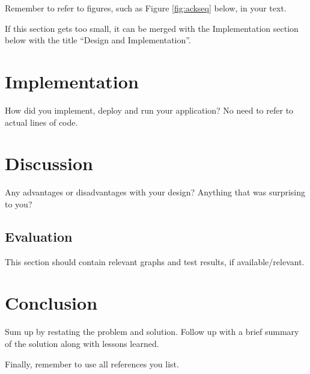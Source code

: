 \documentclass{article}
\begin{document}
Remember to refer to figures, such as Figure \ref{fig:ackseq} below, in your text.


If this section gets too small, it can be merged with the Implementation section below with the title ``Design and Implementation''.

\section{Implementation}

How did you implement, deploy and run your application? No need to refer to actual lines of code.

\section{Discussion}

Any advantages or disadvantages with your design? Anything that was surprising to you?

\subsection{Evaluation}

This section should contain relevant graphs and test results, if available/relevant.

\section{Conclusion}

Sum up by restating the problem and solution. Follow up with a brief summary of the solution along with lessons learned. 

Finally, remember to use all references you list\cite{pathen98}.



\newpage{}

\printbibliography
\end{document}
